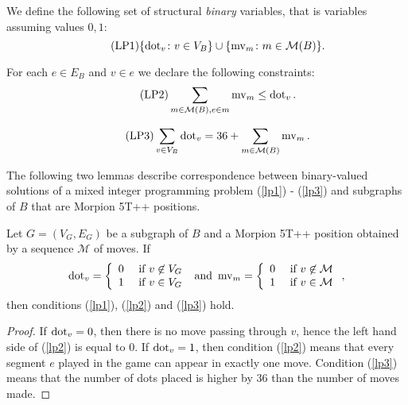 We define the following set of structural {\em binary} variables, that is variables assuming values $0,1$:
\[
  \tag{LP1}
  \{ \operatorname{dot}_v \colon v \in V_B \} \cup \{ \operatorname{mv}_m \colon m \in \mathcal{M}(B) \}.
  \label{lp1}
\]

\noindent
For each $e \in E_B$ and $v \in e$ we declare the following constraints:
\begin{equation}
  \tag{LP2}  \sum_{ m \in \mathcal{M}(B), e \in m } \operatorname{mv}_m \leq \operatorname{dot}_v.
  \label{lp2}
\end{equation}

\begin{equation}
  \tag{LP3} \sum_{v \in V_B} \operatorname{dot}_v = 36 + \sum_{m \in \mathcal{M}(B)} \operatorname{mv}_m. 
  \label{lp3}
\end{equation}

The following two lemmas describe correspondence between binary-valued solutions of a mixed integer programming problem (\ref{lp1}) - (\ref{lp3}) and subgraphs of $B$ that are Morpion 5T++ positions.

\begin{lemma} Let $G=(V_G,E_G)$ be a subgraph of $B$ and a Morpion 5T++ position obtained by a sequence $\mathcal{M}$ of moves. If
\[
  \operatorname{dot}_v = \left\{ 
    \begin{array}{ll}
      0 & \text{ if } v \not\in V_G \\
      1 & \text{ if } v \in V_G
    \end{array}
  \right.
    \text{ and }
  \operatorname{mv}_m = \left\{ 
    \begin{array}{ll}
      0 & \text{ if } v \not\in \mathcal{M} \\
      1 & \text{ if } v \in \mathcal{M}
    \end{array}
  \right.,
\]
then conditions (\ref{lp1}), (\ref{lp2}) and (\ref{lp3}) hold. 
\end{lemma}

\begin{proof}
If $\operatorname{dot}_v=0$, then there is no move passing through $v$, hence the left hand side of (\ref{lp2}) is equal to $0$. If $\operatorname{dot}_v=1$, then  condition (\ref{lp2}) means that every segment $e$ played in the game can appear in exactly one move.  Condition (\ref{lp3}) means that the number of dots placed is higher by 36 than the number of moves made.
\end{proof}

